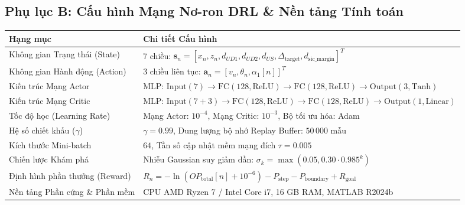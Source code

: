 \subsection*{Phụ lục B: Cấu hình Mạng Nơ-ron DRL \& Nền tảng Tính toán}
\vspace{0.2cm}
\begin{center}
\renewcommand{\arraystretch}{1.25}
\begin{tabularx}{\textwidth}{|p{4.8cm}|X|}
\hline
\rowcolor{tableheader}
\textbf{Hạng mục} & \textbf{Chi tiết Cấu hình} \\
\hline
Không gian Trạng thái (State) & 7 chiều: $\mathbf{s}_n = [x_n, z_n, d_{UD1}, d_{UD2}, d_{US}, \Delta_{\text{target}}, d_{\text{sic\_margin}}]^T$ \\
Không gian Hành động (Action) & 3 chiều liên tục: $\mathbf{a}_n = [v_n, \theta_n, \alpha_1[n]]^T$ \\
Kiến trúc Mạng Actor & MLP: $\text{Input}(7) \to \text{FC}(128, \text{ReLU}) \to \text{FC}(128, \text{ReLU}) \to \text{Output}(3, \text{Tanh})$ \\
Kiến trúc Mạng Critic & MLP: $\text{Input}(7+3) \to \text{FC}(128, \text{ReLU}) \to \text{FC}(128, \text{ReLU}) \to \text{Output}(1, \text{Linear})$ \\
Tốc độ học (Learning Rate) & Mạng Actor: $10^{-4}$, Mạng Critic: $10^{-3}$, Bộ tối ưu hóa: Adam \cite{kingma2014adam} \\
Hệ số chiết khấu ($\gamma$) & $\gamma = 0.99$, Dung lượng bộ nhớ Replay Buffer: $50\,000$ mẫu \\
Kích thước Mini-batch & $64$, Tần số cập nhật mềm mạng đích $\tau = 0.005$ \\
Chiến lược Khám phá & Nhiễu Gaussian suy giảm dần: $\sigma_k = \max(0.05, 0.30 \cdot 0.985^k)$ \\
Định hình phần thưởng (Reward) & $R_n = -\ln(OP_{\text{total}}[n] + 10^{-6}) - P_{\text{step}} - P_{\text{boundary}} + R_{\text{goal}}$ \\
Nền tảng Phần cứng \& Phần mềm & CPU AMD Ryzen 7 / Intel Core i7, 16 GB RAM, MATLAB R2024b \\
\hline
\end{tabularx}
\end{center}
\vspace{0.3cm}

